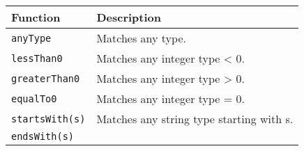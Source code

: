 \documentclass[
]{article}
\begin{document}
\begin{RaggedRight}\small\begin{longtable}[]{p{1.7in}p{4.3in}}
\toprule
\begin{minipage}[b]{0.27\columnwidth}\raggedright
\textbf{Function}\strut
\end{minipage} & \begin{minipage}[b]{0.67\columnwidth}\raggedright
\textbf{Description}\strut
\end{minipage}\tabularnewline
\midrule
\endhead
\begin{minipage}[t]{0.27\columnwidth}\raggedright
\texttt{anyType}\strut
\end{minipage} & \begin{minipage}[t]{0.67\columnwidth}\raggedright
Matches any type.\strut
\end{minipage}\tabularnewline
\begin{minipage}[t]{0.27\columnwidth}\raggedright
\texttt{lessThan0}\strut
\end{minipage} & \begin{minipage}[t]{0.67\columnwidth}\raggedright
Matches any integer type \textless{} 0.\strut
\end{minipage}\tabularnewline
\begin{minipage}[t]{0.27\columnwidth}\raggedright
\texttt{greaterThan0}\strut
\end{minipage} & \begin{minipage}[t]{0.67\columnwidth}\raggedright
Matches any integer type \textgreater{} 0.\strut
\end{minipage}\tabularnewline
\begin{minipage}[t]{0.27\columnwidth}\raggedright
\texttt{equalTo0}\strut
\end{minipage} & \begin{minipage}[t]{0.67\columnwidth}\raggedright
Matches any integer type = 0.\strut
\end{minipage}\tabularnewline
\begin{minipage}[t]{0.27\columnwidth}\raggedright
\texttt{startsWith(s)}\strut
\end{minipage} & \begin{minipage}[t]{0.67\columnwidth}\raggedright
Matches any string type starting with s.\strut
\end{minipage}\tabularnewline
\begin{minipage}[t]{0.27\columnwidth}\raggedright
\texttt{endsWith(s)}\strut
\end{minipage} & \begin{minipage}[t]{0.67\columnwidth}\raggedright

\end{minipage}
\end{longtable}
\end{RaggedRight}
\end{document}

